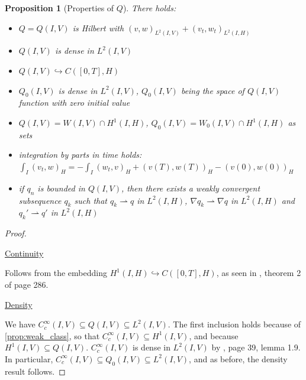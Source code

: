 \documentclass[english,a4paper,10pt,oneside]{scrbook}	%
\theoremstyle{break}
\newtheorem{prop}[equation]{Proposition}
\newenvironment{mproof}[1][\proofname]{%
  \begin{proof}[#1]$ $\par\nobreak\ignorespaces
}{%
  \end{proof}
}
\renewcommand*{\proofname}{Proof}
\theoremstyle{remark}
\newcommand{\ds}{\displaystyle}
\newcommand{\emb}{\hookrightarrow}
\newcommand{\weakc}{\rightharpoonup}
\begin{document}
\begin{appendices}
\begin{prop}[Properties of $Q$]
\label{prop:Q}
There holds:
\begin{itemize}
	\item $Q=Q(I,V)$ is Hilbert with $(v,w)_{L^2(I,V)} + (v_t,w_t)_{L^2(I,H)}$ 
	\item $Q(I,V)$ is dense in $L^2(I,V)$
	\item $Q(I,V)\emb C([0,T],H)$
	\item $Q_0(I,V)$ is dense in $L^2(I,V)$, $Q_0(I,V)$ being the space of $Q(I,V)$ function with zero initial value
	\item $Q(I,V) = W(I,V)\cap H^1(I,H)$, $Q_0(I,V) =  W_0(I,V)\cap H^1(I,H)$ as sets
	\item integration by parts in time holds: $\ds \int_I(v_t,w)_H = -\int_I(w_t,v)_H +(v(T),w(T))_H-(v(0),w(0))_H$
	\item if $q_n$ is bounded in $Q(I,V)$, then there exists a weakly convergent subsequence $q_k$ such that $q_k\weakc q$ in $L^2(I,H)$, $\nabla q_k\weakc \nabla q$ in $L^2(I,H)$ and $q_k'\weakc q'$ in $L^2(I,H)$
\end{itemize}
\end{prop}
\begin{mproof}

%
%
%

\underline{Continuity}

Follows from the embedding $H^1(I,H)\emb C([0,T],H)$, as seen in \cite{evans}, theorem 2 of page 286.

\underline{Density}

We have $C_c^\infty(I,V) \subseteq Q(I,V) \subseteq L^2(I,V)$. The first inclusion holds because of \cref{prop:weak_class}, so that $C_c^\infty(I,V)\subseteq H^1(I,V)$, and because $H^1(I,V)\subseteq  Q(I,V) $. $C_c^\infty(I,V)$ is dense in $ L^2(I,V)$ by \cite{hinze}, page 39, lemma 1.9. In particular,  $C_c^\infty(I,V) \subseteq Q_0(I,V)\subseteq L^2(I,V)$, and as before, the density result follows.


\end{mproof}
\end{appendices}
\end{document}
